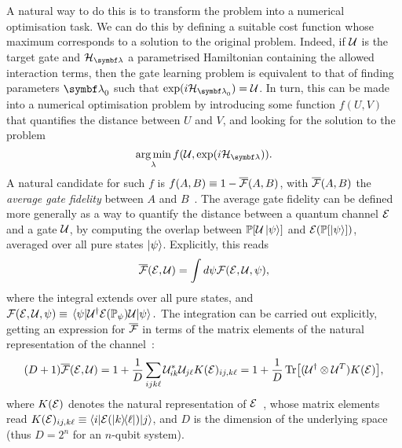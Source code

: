 A natural way to do this is to transform the problem into a numerical optimisation task. We can do this by defining a suitable cost function whose maximum corresponds to a solution to the original problem.
Indeed, if ${\mathcal{U}}$ is the target gate and $\calH_\bslambda$ a parametrised Hamiltonian containing the allowed interaction terms, then the gate learning problem is equivalent to that of finding parameters $\bslambda_0$ such that $\exponential(i\calH_{\bslambda_0})=\calU$.
In turn, this can be made into a numerical optimisation problem by introducing some function $f(U, V)$ that quantifies the distance between $U$ and $V$, and looking for the solution to the problem
\begin{equation}
    \argmin_\lambda f(\calU, \exponential(i\calH_{\bslambda})).
    \label{eq:GL:gatelearning_as_optimisation}
\end{equation}
A natural candidate for such $f$ is $f(A,B)\equiv 1-\overline{{\mathcal{F}}}(A,B)$, with $\overline{{\mathcal{F}}}(A,B)$ the \textit{average gate fidelity} between $A$ and $B$~\cite{nielsen2002simple,magesan2011gate}. The average gate fidelity can be defined more generally as a way to quantify the distance between a quantum channel ${\mathcal{E}}$ and a gate ${\mathcal{U}}$, by computing the overlap between $\mathbb{P}[{\mathcal{U}}\ket\psi]$ and ${\mathcal{E}}(\mathbb{P}[\ket\psi])$, averaged over all pure states $\ket\psi$. Explicitly, this reads
\begin{equation}
    \overline{{\mathcal{F}}}({\mathcal{E}},{\mathcal{U}}) = \int d\psi {\mathcal{F}}({\mathcal{E}}, {\mathcal{U}}, \psi),
\end{equation}
where the integral extends over all pure states, and
$
    {\mathcal{F}}({\mathcal{E}}, {\mathcal{U}}, \psi) \equiv
    \mel*{\psi}{{\mathcal{U}}^\dagger {\mathcal{E}}(\mathbb{P}_\psi){\mathcal{U}}}{\psi}.
$
The integration can be carried out explicitly, getting an expression for $\overline{{\mathcal{F}}}$ in terms of the matrix elements of the natural representation of the channel~\cite{pedersen2007fidelity,banchi2011nonperturbative,magesan2011gate,banchi2016quantum}:
\begin{equation}
    (D+1) \overline{{\mathcal{F}}}({\mathcal{E}},{\mathcal{U}}) =
    1 + \frac{1}{D}\sum_{ijk\ell}{\mathcal{U}}^*_{ik} {\mathcal{U}}_{j\ell}K({\mathcal{E}})_{ij,k\ell}
    = 1 + \frac{1}{D}\Tr[({\mathcal{U}}^\dagger\otimes {\mathcal{U}}^T)K({\mathcal{E}})],
    \label{eq:GL:explicit_fidelity_map_unitary}
\end{equation}
where $K({\mathcal{E}})$ denotes the natural representation of ${\mathcal{E}}$~\cite{watrous2018theory}, whose matrix elements read
$K({\mathcal{E}})_{ij,k\ell}\equiv\langle i|{\mathcal{E}}(\ketbra{k}{\ell})|j\rangle$, and
$D$ is the dimension of the underlying space (thus $D=2^n$ for an $n$-qubit system).

